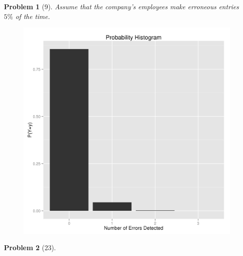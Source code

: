 \documentclass{article}
\theoremstyle{problem}
\newtheorem{prob}{Problem}
\begin{document}
\begin{prob}[9]
Assume that the company's employees make erroneous entries $5\%$ of the time.
    \begin{figure}
      \includegraphics{hist_prob9.png}
    \end{figure}
\end{prob}

\begin{prob}[23]
  
\end{prob}
\end{document}
